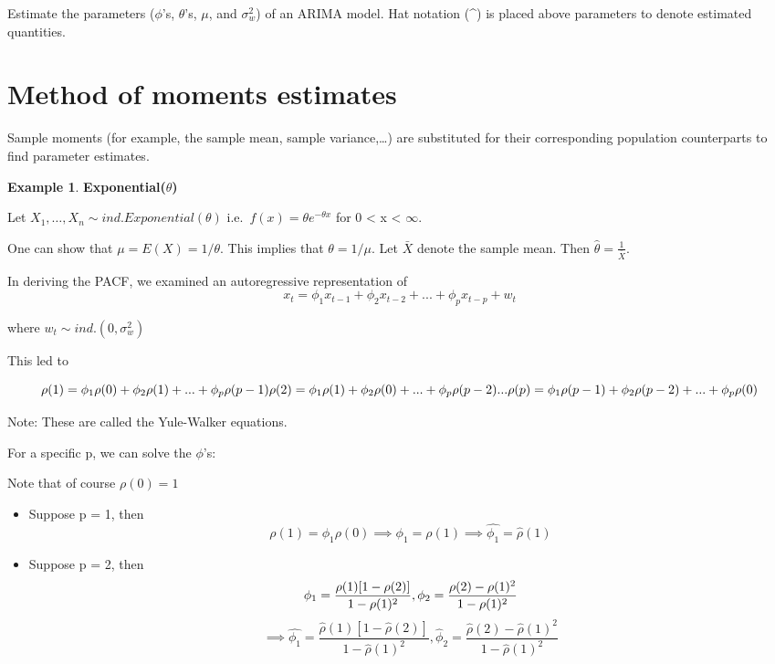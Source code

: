\documentclass[
]{book}
\theoremstyle{definition}
\theoremstyle{definition}
\newtheorem{example}{Example}[chapter]
\theoremstyle{definition}
\theoremstyle{definition}
\theoremstyle{remark}
\begin{document}
Estimate the parameters (\(\phi\)'s, \(\theta\)'s, \(\mu\), and \(\sigma_w^2\)) of an ARIMA model. Hat notation (\^{}) is placed above parameters to denote estimated quantities.

\hypertarget{method-of-moments-estimates}{%
\section{Method of moments estimates}\label{method-of-moments-estimates}}

Sample moments (for example, the sample mean, sample variance,\ldots) are substituted for their corresponding population counterparts to find parameter estimates.

\begin{example}
\textbf{Exponential(\(\theta\))}

Let \(X_1, …, X_n \sim ind. Exponential(\theta)\)
i.e.~\(f(x)=\theta e^{-\theta x}\) for 0 \textless{} x \textless{} \(\infty\).

One can show that \(\mu = E(X) = 1/\theta\). This implies that \(\theta = 1/\mu\). Let \(\bar{X}\) denote the sample mean. Then \(\hat{\theta}=\frac{1}{\bar{X}}\).
\end{example}

In deriving the PACF, we examined an autoregressive representation of \[x_t=\phi_1x_{t-1}+\phi_2x_{t-2}+...+\phi_px_{t-p}+w_t\]

where \(w_t \sim ind.(0,\sigma_w^2)\)

This led to

\[\rho(1)=\phi_1\rho(0)+\phi_2\rho(1)+...+\phi_p\rho(p-1)\\
\rho(2)=\phi_1\rho(1)+\phi_2\rho(0)+...+\phi_p\rho(p-2)\\
...\\
\rho(p)=\phi_1\rho(p-1)+\phi_2\rho(p-2)+...+\phi_p\rho(0)\]

Note: These are called the Yule-Walker equations.

For a specific p, we can solve the \(\phi\)'s:

Note that of course \(\rho(0)=1\)

\begin{itemize}
\item
  Suppose p = 1, then \[\rho(1)=\phi_1\rho(0)\implies \phi_1=\rho(1)\implies \hat{\phi_1}=\hat{\rho}(1)\]
\item
  Suppose p = 2, then \[\phi_1=\frac{\rho(1)[1-\rho(2)]}{1-\rho(1)^2},\\  \phi_2=\frac{\rho(2)-\rho(1)^2}{1-\rho(1)^2}\]
  \[\implies \hat{\phi_1}=\frac{\hat{\rho}(1)[1-\hat{\rho}(2)]}{1-\hat{\rho}(1)^2}, \hat{\phi}_2=\frac{\hat{\rho}(2)-\hat{\rho}(1)^2}{1-\hat{\rho}(1)^2}\]
\end{itemize}
\end{document}

